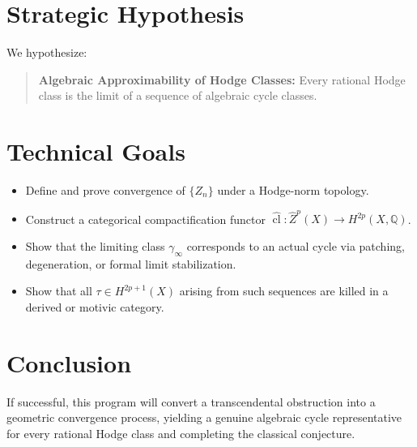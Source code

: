 \documentclass[12pt]{article}
\begin{document}
\section{Strategic Hypothesis}
We hypothesize:

\begin{quote}
\textbf{Algebraic Approximability of Hodge Classes:} Every rational Hodge class is the limit of a sequence of algebraic cycle classes.
\end{quote}

\section{Technical Goals}
\begin{itemize}
    \item Define and prove convergence of \( \{Z_n\} \) under a Hodge-norm topology.
    \item Construct a categorical compactification functor \( \widehat{\operatorname{cl}}: \widehat{Z}^p(X) \to H^{2p}(X, \mathbb{Q}) \).
    \item Show that the limiting class \( \gamma_\infty \) corresponds to an actual cycle via patching, degeneration, or formal limit stabilization.
    \item Show that all \( \tau \in H^{2p+1}(X) \) arising from such sequences are killed in a derived or motivic category.
\end{itemize}

\section{Conclusion}
If successful, this program will convert a transcendental obstruction into a geometric convergence process, yielding a genuine algebraic cycle representative for every rational Hodge class and completing the classical conjecture.
\end{document}
